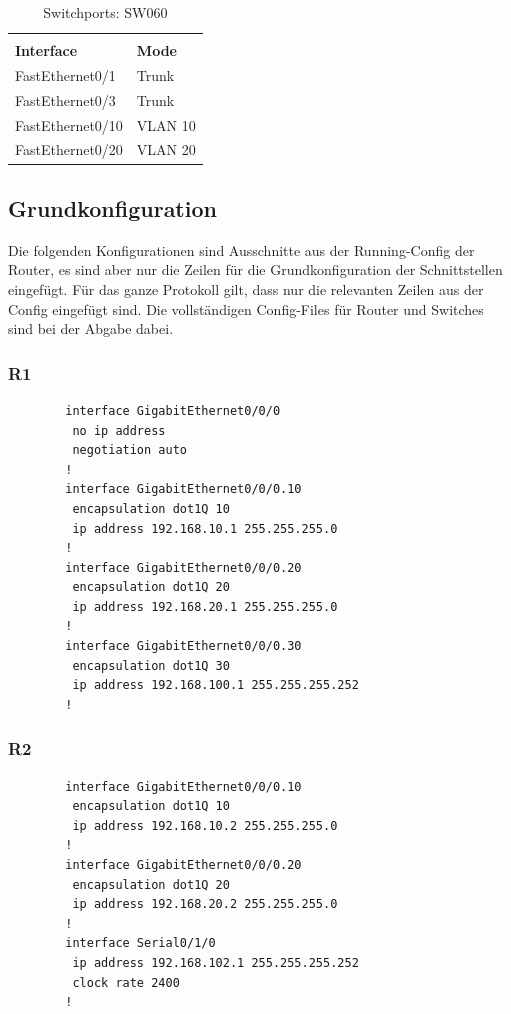 \documentclass[a4paper, ngerman]{article}
\begin{document}
\begin{table}[H]
    \caption{Switchports: SW060} %
    \centering %
    \begin{tabular}{l l} %
        \hline\hline
        \\
        \textbf{Interface} & \textbf{Mode} \\ [0.5ex]
        \hline
        FastEthernet0/1    & Trunk         \\ %
        FastEthernet0/3    & Trunk         \\
        FastEthernet0/10   & VLAN 10       \\
        FastEthernet0/20   & VLAN 20       \\ [1ex]
        \hline
    \end{tabular}
    \label{table:nonlin} %
\end{table}

\subsection{Grundkonfiguration}
Die folgenden Konfigurationen sind Ausschnitte aus der Running-Config der Router, es sind aber
nur die Zeilen für die Grundkonfiguration der Schnittstellen eingefügt. Für das ganze Protokoll gilt, dass nur die relevanten Zeilen aus der Config eingefügt sind.
Die vollständigen Config-Files für Router und Switches
sind bei der Abgabe dabei.
\subsubsection{R1}
\begin{framed}
    \begin{verbatim}
        interface GigabitEthernet0/0/0
         no ip address
         negotiation auto
        !
        interface GigabitEthernet0/0/0.10
         encapsulation dot1Q 10
         ip address 192.168.10.1 255.255.255.0
        !
        interface GigabitEthernet0/0/0.20
         encapsulation dot1Q 20
         ip address 192.168.20.1 255.255.255.0
        !
        interface GigabitEthernet0/0/0.30
         encapsulation dot1Q 30
         ip address 192.168.100.1 255.255.255.252
        ! 
    \end{verbatim}
\end{framed}

\subsubsection{R2}
\begin{framed}
    \begin{verbatim}
        interface GigabitEthernet0/0/0.10
         encapsulation dot1Q 10
         ip address 192.168.10.2 255.255.255.0
        !
        interface GigabitEthernet0/0/0.20
         encapsulation dot1Q 20
         ip address 192.168.20.2 255.255.255.0
        !
        interface Serial0/1/0
         ip address 192.168.102.1 255.255.255.252
         clock rate 2400
        !
    \end{verbatim}
\end{framed}
\end{document}
